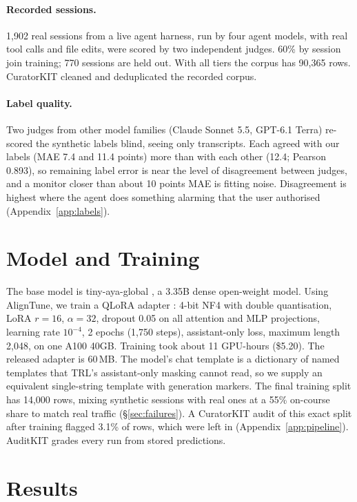 \documentclass[11pt]{article}
\begin{document}
\paragraph{Recorded sessions.} 1,902 real sessions from a live agent harness, run by four agent models, with real tool calls and file edits, were scored by two independent judges. 60\% by session join training; 770 sessions are held out. With all tiers the corpus has 90,365 rows. CuratorKIT cleaned and deduplicated the recorded corpus.

\paragraph{Label quality.} Two judges from other model families (Claude Sonnet 5.5, GPT-6.1 Terra) re-scored the synthetic labels blind, seeing only transcripts. Each agreed with our labels (MAE 7.4 and 11.4 points) more than with each other (12.4; Pearson 0.893), so remaining label error is near the level of disagreement between judges, and a monitor closer than about 10 points MAE is fitting noise. Disagreement is highest where the agent does something alarming that the user authorised (Appendix~\ref{app:labels}).

\section{Model and Training}

The base model is tiny-aya-global \citep{tinyaya}, a 3.35B dense open-weight model. Using AlignTune, we train a QLoRA adapter \citep{dettmers2023qlora,hu2022lora}: 4-bit NF4 with double quantisation, LoRA $r{=}16$, $\alpha{=}32$, dropout 0.05 on all attention and MLP projections, learning rate $10^{-4}$, 2 epochs (1,750 steps), assistant-only loss, maximum length 2,048, on one A100 40GB. Training took about 11 GPU-hours (\$5.20). The released adapter is 60\,MB. The model's chat template is a dictionary of named templates that TRL's assistant-only masking cannot read, so we supply an equivalent single-string template with generation markers. The final training split has 14,000 rows, mixing synthetic sessions with real ones at a 55\% on-course share to match real traffic (\S\ref{sec:failures}). A CuratorKIT audit of this exact split after training flagged 3.1\% of rows, which were left in (Appendix~\ref{app:pipeline}). AuditKIT grades every run from stored predictions.

\section{Results}
\end{document}

